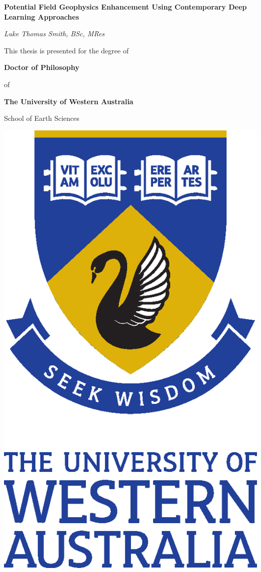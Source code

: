\documentclass[12pt,a4paper,notitlepage]{report} %
\begin{document}
\begin{titlepage}
    \centering

    \vspace*{48 pt}
    {\large\textbf{Potential Field Geophysics Enhancement Using Contemporary Deep Learning Approaches}}

    \vspace{48 pt}
    {\itshape{{\Large Luke Thomas Smith}, BSc, MRes}}

    \vspace{48 pt}
    This thesis is presented for the degree of

    \vspace{14 pt}
    \textbf{Doctor of Philosophy}

    of

    \textbf{The University of Western Australia}

    \vspace{14 pt}
    School of Earth Sciences

    \vspace{72 pt}
    \includegraphics[scale=0.35]{fig/etc/UWA_FORMAL_PORTRAIT_CMYK}


\end{titlepage}
\end{document}
